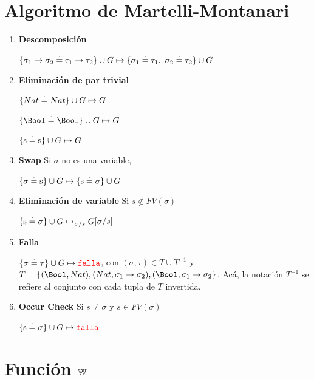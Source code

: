 \documentclass[10pt,a4paper]{article}
\begin{document}
\section{Algoritmo de Martelli-Montanari}
\begin{enumerate}
\item \textbf{Descomposición}

$\{\sigma_1\to\sigma_2 \overset{\cdot}{=}\tau_1\to\tau_2\}\cup G\mapsto \{\sigma_1\overset{\cdot}{=}\tau_1,~\sigma_2 \overset{\cdot}{=}\tau_2\}\cup G$
\item \textbf{Eliminación de par trivial}

$\{ Nat \overset{\cdot}{=} Nat\}\cup G\mapsto G$

$\{\Bool \equalDot\Bool\}\cup G\mapsto G$

$\{\text{s} \overset{\cdot}{=}\text{s}\}\cup G\mapsto G$
\item \textbf{Swap} Si $\sigma$ no es una variable,

$\{\sigma \overset{\cdot}{=}\text{s}\}\cup G\mapsto \{\text{s}\overset{\cdot}{=}\sigma\}\cup G$

\item \textbf{Eliminación de variable} Si $s\notin FV(\sigma)$

$\{\text{s}\overset{\cdot}{=}\sigma\}\cup G\mapsto_{\sigma/s} G[\sigma/s]$

\item \textbf{Falla}

$\{\sigma\overset{\cdot}{=}\tau\}\cup G\mapsto {\color{red}\texttt{falla}}$, con $(\sigma,\tau)\in T\cup T^{-1}$ y $T =\{(\Bool, Nat), (Nat, \sigma_1\to\sigma_2), (\Bool, \sigma_1\to\sigma_2\}$. Acá, la notación $T^{-1}$ se refiere al conjunto con cada tupla de $T$ invertida.

\item \textbf{Occur Check} Si $s\neq\sigma$ y $s\in FV(\sigma)$

$\{\text{s}\overset{\cdot}{=}\sigma\}\cup G\mapsto {\color{red}\texttt{falla}}$
\end{enumerate}

\section{Función $\mathbb{W}$}
\end{document}
